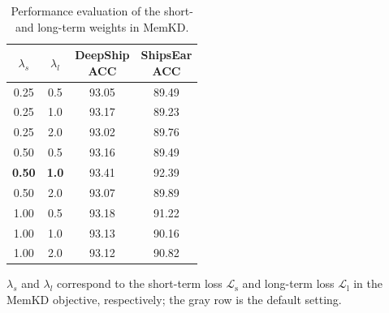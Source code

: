﻿\documentclass[lettersize,journal]{IEEEtran}
\begin{document}
\begin{table}[htbp]
\centering
\caption{Performance evaluation of the short- and long-term weights in MemKD.}
\label{tab:memkd_weight_analysis}
\small
\setlength{\tabcolsep}{9pt}
\begin{tabular}{c|c|c|c}
\toprule
$\lambda_s$ & $\lambda_l$ &
\makecell{DeepShip\\ACC} &
\makecell{ShipsEar\\ACC} \\
\midrule
0.25 & 0.5 & 93.05 & 89.49 \\
0.25 & 1.0 & 93.17 & 89.23 \\
0.25 & 2.0 & 93.02 & 89.76 \\
0.50 & 0.5 & 93.16 & 89.49 \\
\rowcolor{gray!15}
\textbf{0.50} & \textbf{1.0} & 93.41 & 92.39 \\
0.50 & 2.0 & 93.07 & 89.89 \\
1.00 & 0.5 & 93.18 & 91.22 \\
1.00 & 1.0 & 93.13 & 90.16 \\
1.00 & 2.0 & 93.12 & 90.82 \\
\bottomrule
\end{tabular}
\vspace{0.5ex}
\par\footnotesize $\lambda_s$ and $\lambda_l$ correspond to the short-term loss $\mathcal{L}_{\mathrm{s}}$ and long-term loss $\mathcal{L}_{\mathrm{l}}$ in the MemKD objective, respectively; the gray row is the default setting.
\end{table}
\end{document}
